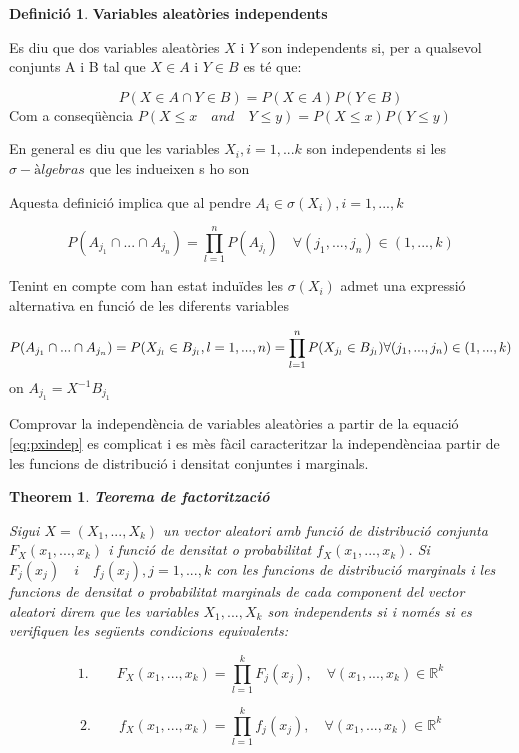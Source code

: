 \documentclass[
  catalan,
]{article}
\newtheorem{theorem}{Theorem}[section]
\theoremstyle{definition}
\newtheorem{definition}{Definició}[section]
\theoremstyle{definition}
\theoremstyle{definition}
\theoremstyle{definition}
\theoremstyle{remark}
\begin{document}
\begin{definition}
\protect\hypertarget{def:indep}{}\label{def:indep}\textbf{Variables aleatòries independents}

Es diu que dos variables aleatòries \(X\) i \(Y\) son independents si, per a qualsevol conjunts A i B tal que \(X \in A\) i \(Y \in B\) es té que:

\[
P(X \in A \cap  Y \in B) =P(X \in A) P(Y \in B)
\]
Com a conseqüència \(P(X \leq x \quad and  \quad   Y \leq y )=P(X \leq x)P(Y \leq y )\)

En general es diu que les variables \(X_i, i=1,...k\) son independents si les \(\sigma-àlgebras\) que les indueixen s ho son

Aquesta definició implica que al pendre \(A_i \in \sigma(X_i), i=1,...,k\)

\[
P(A_{j_1} \cap ...\cap A_{j_n} ) =\prod_{l=1}^n P(A_{j_l})  \quad \forall(j_1,...,j_n) \in(1,...,k) 
\]

Tenint en compte com han estat induïdes les \(\sigma(X_i)\) admet una expressió alternativa en funció de les diferents variables

\[
P(A_{j_1} \cap ...\cap A_{j_n} ) =P(X_{j_l} \in B_{j_l},l=1,...,n)=  
\prod_{l=1}^n P(X_{j_l} \in  B_{j_l})  \\  \forall(j_1,...,j_n) \in(1,...,k)  
\label{eq:pxindep}
\]
on \(A_{j_1}=X^{-1}B_{j_1}\)
\end{definition}

Comprovar la independència de variables aleatòries a partir de la equació \eqref{eq:pxindep} es complicat i es mès fàcil caracteritzar la independènciaa partir de les funcions de distribució i densitat conjuntes i marginals.

\begin{theorem}
\textbf{Teorema de factorització}

Sigui \(X=(X_1,...,X_k)\) un vector aleatori amb funció de distribució conjunta \(F_X(x_1,...,x_k)\) i funció de densitat o probabilitat \(f_X(x_1,...,x_k)\). Si \(F_j(x_j) \quad i \quad f_j(x_j)  , j=1,...,k\) con les funcions de distribució marginals i les funcions de densitat o probabilitat marginals de cada component del vector aleatori direm que les variables \(X_1,...,X_k\) son independents si i només si es verifiquen les següents condicions equivalents:

\[ 
1.\qquad F_X(x_1,...,x_k)= \prod_{l=1}^k F_j(x_j), \quad \forall (x_1,...,x_k) \in \mathbb{R}^k \label{eq:Fxindep}
\]

\[
2. \qquad f_X(x_1,...,x_k)= \prod_{l=1}^k f_j(x_j), \quad \forall (x_1,...,x_k) \in \mathbb{R}^k \label{eq:fpxindep}
\]
\end{theorem}
\end{document}
